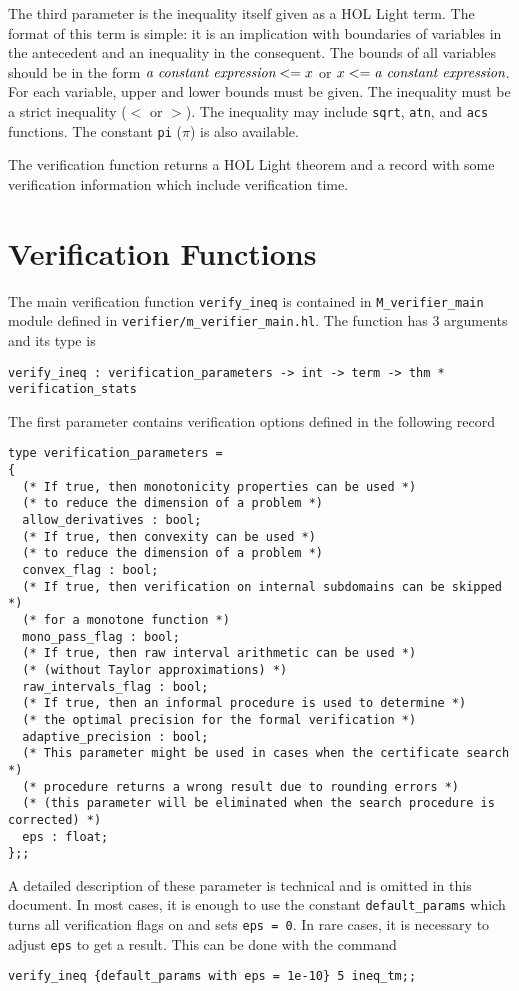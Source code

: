 \documentclass[a4paper]{article}
\begin{document}
The third parameter is the inequality itself given as a HOL Light term. The format of this term is simple: it is an implication with boundaries of variables in the antecedent and an inequality in the consequent. The bounds of all variables should be in the form $\text{\it a constant expression} <= x$ or $x <= \text{\it a constant expression}$. For each variable, upper and lower bounds must be given. The inequality must be a strict inequality ($<$ or $>$). The inequality may include \verb|sqrt|, \verb|atn|, and \verb|acs| functions. The constant \verb|pi| ($\pi$) is also available.

The verification function returns a HOL Light theorem and a record with some verification information which include verification time.


\section{Verification Functions}\label{verification}
The main verification function \verb|verify_ineq| is contained in \verb|M_verifier_main| module defined in \verb|verifier/m_verifier_main.hl|. The function has 3 arguments and its type is
\begin{verbatim}
verify_ineq : verification_parameters -> int -> term -> thm * verification_stats
\end{verbatim}

The first parameter contains verification options defined in the following record
\begin{verbatim}
type verification_parameters =
{
  (* If true, then monotonicity properties can be used *)
  (* to reduce the dimension of a problem *)
  allow_derivatives : bool;
  (* If true, then convexity can be used *)
  (* to reduce the dimension of a problem *)
  convex_flag : bool;
  (* If true, then verification on internal subdomains can be skipped *)
  (* for a monotone function *)
  mono_pass_flag : bool;
  (* If true, then raw interval arithmetic can be used *)
  (* (without Taylor approximations) *)
  raw_intervals_flag : bool;
  (* If true, then an informal procedure is used to determine *)
  (* the optimal precision for the formal verification *)
  adaptive_precision : bool;
  (* This parameter might be used in cases when the certificate search *)
  (* procedure returns a wrong result due to rounding errors *)
  (* (this parameter will be eliminated when the search procedure is corrected) *)
  eps : float;
};;
\end{verbatim}
A detailed description of these parameter is technical and is omitted in this document. In most cases, it is enough to use the constant \verb|default_params| which turns all verification flags on and sets \verb|eps = 0|. In rare cases, it is necessary to adjust \verb|eps| to get a result. This can be done with the command
\begin{verbatim}
verify_ineq {default_params with eps = 1e-10} 5 ineq_tm;;
\end{verbatim}
\end{document}
